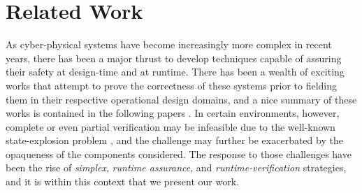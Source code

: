 \documentclass[manuscript,screen,review]{acmart}
\begin{document}
\section{Related Work}

As cyber-physical systems have become increasingly more complex in recent years, there has been a major thrust to develop techniques capable of assuring their safety at design-time and at runtime. There has been a wealth of exciting works that attempt to prove the correctness of these systems prior to fielding them in their respective operational design domains, and a nice summary of these works is contained in the following papers \cite{Maler14,Tomlin2003,Doyen2018,Yang2017,Clark2013,Kwon2018}. In certain environments, however, complete or even partial verification may be infeasible due to the well-known state-explosion problem \cite{Valmari1998}, and the challenge may further be exacerbated by the opaqueness of the components considered. The response to those challenges have been the rise of \textit{simplex}, \textit{runtime assurance}, and \textit{runtime-verification} strategies, and it is within this context that we present our work.
\end{document}

